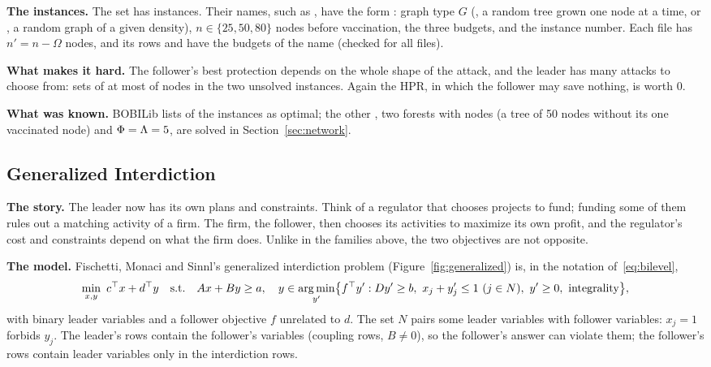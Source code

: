 \textbf{The instances.} The set  has \FamNetworkAll{} instances. Their names,
such as , have the form
: graph type
$G$ (, a random tree grown one node at a time, or , a random graph of a
given density), $n\in\{25,50,80\}$ nodes before vaccination, the three budgets, and the instance
number. Each file has $n'=n-\Omega$ nodes, and its rows  and  have the
budgets of the name (checked for all \FamNetworkAll{} files).

\textbf{What makes it hard.} The follower's best protection depends on the whole shape of the
attack, and the leader has many attacks to choose from: \NetworkAttacks{} sets of at most
\NetworkPhi{} of \NetworkNodes{} nodes in the two unsolved instances. Again the HPR, in which
the follower may save nothing, is worth 0.

\textbf{What was known.} BOBILib lists \NetworkBobiOptimal{} of the \FamNetworkAll{} instances as
optimal; the other \FamNetworkUnsolved{}, two forests with \NetworkNodes{} nodes (a tree of 50 nodes
without its one vaccinated node) and $\Phi=\Lambda=5$, are solved in Section~\ref{sec:network}.

\subsection{Generalized Interdiction}\label{sec:prob-generalized}

\textbf{The story.} The leader now has its own plans and constraints. Think of a regulator that
chooses projects to fund; funding some of them rules out a matching activity of a firm. The
firm, the follower, then chooses its activities to maximize its own profit, and the regulator's
cost and constraints depend on what the firm does. Unlike in the families above, the two
objectives are not opposite.

\textbf{The model.} Fischetti, Monaci and Sinnl's generalized interdiction
problem\cite{fischetti2018dynamic} (Figure~\ref{fig:generalized}) is, in the notation
of~\eqref{eq:bilevel},
\[
\min_{x,y}\ c^{\top} x+d^{\top} y\quad\text{s.t.}\quad Ax+By\ge a,\quad
y\in\operatorname*{arg\,min}_{y'}\bigl\{f^{\top} y' : Dy'\ge b,\ x_j+y'_j\le 1\ (j\in N),\ y'\ge 0,\
\text{integrality}\bigr\},
\]
with binary leader variables and a follower objective $f$ unrelated to $d$. The set $N$ pairs some
leader variables with follower variables: $x_j=1$ forbids $y_j$. The leader's rows contain the
follower's variables (coupling rows, $B\ne 0$), so the follower's answer can violate them; the
follower's rows contain leader variables only in the interdiction rows.

